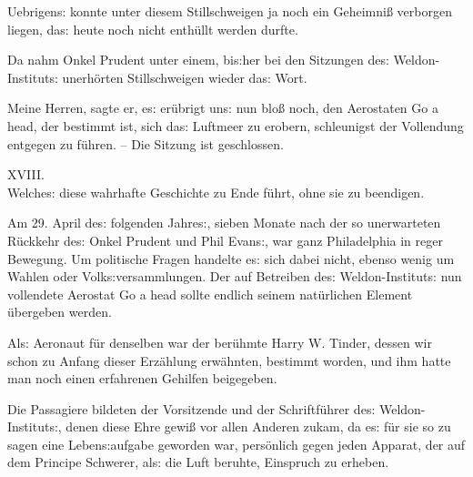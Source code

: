 \documentclass[oneside,12pt]{book}
\newenvironment{antiqua}{\normalfont}{}
\newcommand{\s}{s:}
\begin{document}
Uebrigen{\s} konnte unter diesem Stillschweigen ja noch ein
Geheimni{\ss} verborgen liegen, da{\s} heute noch nicht enth\"ullt
werden durfte.

Da nahm Onkel Prudent unter einem, bi{\s}her bei den Sitzungen de{\s}
Weldon-Institut{\s} unerh\"orten Stillschweigen wieder da{\s} Wort.

{\glqq}Meine Herren, sagte er, e{\s} er\"ubrigt un{\s} nun blo{\ss}
noch, den Aerostaten \begin{antiqua}Go a head\end{antiqua}, der
bestimmt ist, sich da{\s} Luftmeer zu erobern, schleunigst der
Vollendung entgegen zu f\"uhren. -- Die Sitzung ist geschlossen.{\grqq}



\newpage\begin{center}\label{kap18}
{\large \begin{antiqua}XVIII.\end{antiqua}\\
Welche{\s} diese wahrhafte Geschichte zu Ende f\"uhrt, ohne sie zu
beendigen.\\\bigskip}
\end{center}



Am 29. April de{\s} folgenden Jahre{\s}, sieben Monate nach der so
unerwarteten R\"uckkehr de{\s} Onkel Prudent und Phil Evan{\s}, war
ganz Philadelphia in reger Bewegung. Um politische Fragen handelte e{\s}
sich dabei nicht, ebenso wenig um Wahlen oder Volk{\s}versammlungen.
Der auf Betreiben de{\s} Weldon-Institut{\s} nun vollendete Aerostat
\begin{antiqua}Go a head\end{antiqua} sollte endlich seinem
nat\"urlichen Element \"ubergeben werden.

Al{\s} Aeronaut f\"ur denselben war der ber\"uhmte Harry W. Tinder,
dessen wir schon zu Anfang dieser Erz\"ahlung erw\"ahnten, bestimmt
worden, und ihm hatte man noch einen erfahrenen Gehilfen beigegeben.

Die Passagiere bildeten der Vorsitzende und der Schriftf\"uhrer
de{\s} Weldon-Institut{\s}, denen diese Ehre gewi{\ss} vor allen
Anderen zukam, da e{\s} f\"ur sie so zu sagen eine Leben{\s}aufgabe
geworden war, pers\"onlich gegen jeden Apparat, der auf dem Principe
{\glqq}Schwerer, al{\s} die Luft{\grqq} beruhte, Einspruch zu
erheben.
\end{document}
